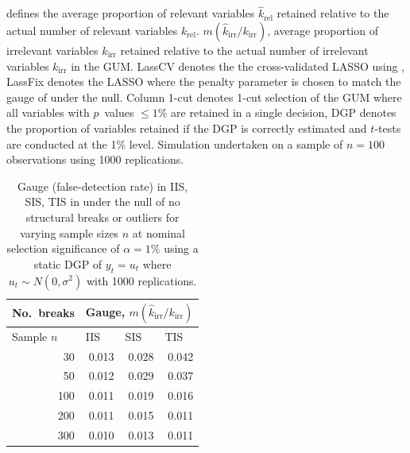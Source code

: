 \documentclass[article,nojss]{jss}
\begin{document}
\begin{table}[t!]
{  defines the average proportion of relevant variables
  $\widehat{k}_{\text{rel}}$ retained relative to the actual number of
  relevant variables
  $k_{\text{rel}}$. $m(\widehat{k}_{\text{irr}}/k_{\text{irr}})$,
  average proportion of irrelevant variables
  $\widehat{k}_{\text{irr}}$ retained relative to the actual number of
  irrelevant variables $k_{\text{irr}}$ in the GUM. LassCV denotes the
  the cross-validated LASSO using , LassFix denotes the
  LASSO where the penalty parameter is chosen to match the gauge of
   under the null. Column 1-cut denotes 1-cut selection of
  the GUM where all variables with $p$~values $\leq 1$\% are retained
  in a single decision, DGP denotes the proportion of variables
  retained if the DGP is correctly estimated and $t$-tests are
  conducted at the 1\% level. Simulation undertaken on a sample of
  $n=100$ observations using 1000
  replications. \label{tab_lassnegcorr} }
\end{table}
		
\begin{table}[t!]
  \centering
    \begin{tabular}{rrrr}
    		\hline 	
    \multicolumn{1}{l}{No.~breaks} & \multicolumn{3}{c}{Gauge,  $m(\widehat{k}_{\text{irr}}/k_{\text{irr}})$} \\ 		\hline
    \multicolumn{1}{l}{Sample $n$} & \multicolumn{1}{l}{IIS} & \multicolumn{1}{l}{SIS} & \multicolumn{1}{l}{TIS} \\ 		\hline
    30    & 0.013 & 0.028 & 0.042 \\
    50    & 0.012 & 0.029 & 0.037 \\
    100   & 0.011 & 0.019 & 0.016 \\
    200   & 0.011 & 0.015 & 0.011 \\
    300   & 0.010 & 0.013 & 0.011 \\ 		\hline
    \end{tabular}%
    \caption{Gauge (false-detection rate) in IIS, SIS, TIS in  under the null of no structural breaks or outliers for varying sample sizes $n$ at nominal selection significance of $\alpha=1\%$ using a static DGP of $y_t=u_t$ where $u_t \sim N(0, \sigma^2)$ with 1000 replications. \label{tab_isatgauge} }
\end{table}	
		
\end{document}
